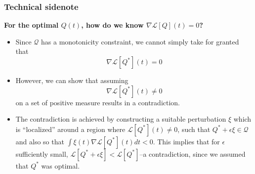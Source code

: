 \documentclass{beamer}
\begin{document}
\begin{frame}
\frametitle{Technical sidenote}
\textbf{For the optimal $Q(t)$, how do we know $\nabla \mathcal{L}[Q](t) = 0$?}

\begin{itemize}
\item Since $\mathcal{Q}$ has a monotonicity constraint, we cannot simply take for granted that
\[
\nabla \mathcal{L}[Q^*](t) = 0
\]
\item However, we can show that assuming 
\[
\nabla \mathcal{L}[Q^*](t) \neq 0
\]
on a set of positive measure results in a contradiction.
\item The contradiction is achieved by constructing a suitable
  perturbation $\xi$ which is ``localized'' around a region where
  $\mathcal{L}[Q^*](t)\neq 0$, such that $Q^* + \epsilon \xi \in
  \mathcal{Q}$ and also so that $\int \xi(t) \nabla
  \mathcal{L}[Q^*](t) dt < 0$.  This implies that for $\epsilon$
  sufficiently small, $\mathcal{L}[Q^* + \epsilon \xi] <
  \mathcal{L}[Q^*]$--a contradiction, since we assumed that $Q^*$ was
  optimal.
\end{itemize}
\end{frame}
\end{document}
